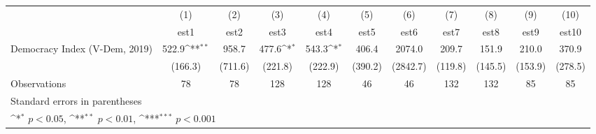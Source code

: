 {
\def\sym#1{\ifmmode^{#1}\else\(^{#1}\)\fi}
\begin{tabular}{l*{10}{c}}
\hline\hline
                    &\multicolumn{1}{c}{(1)}         &\multicolumn{1}{c}{(2)}         &\multicolumn{1}{c}{(3)}         &\multicolumn{1}{c}{(4)}         &\multicolumn{1}{c}{(5)}         &\multicolumn{1}{c}{(6)}         &\multicolumn{1}{c}{(7)}         &\multicolumn{1}{c}{(8)}         &\multicolumn{1}{c}{(9)}         &\multicolumn{1}{c}{(10)}         \\
                    &        est1         &        est2         &        est3         &        est4         &        est5         &        est6         &        est7         &        est8         &        est9         &       est10         \\
\hline
Democracy Index (V-Dem, 2019)&       522.9\sym{**} &       958.7         &       477.6\sym{*}  &       543.3\sym{*}  &       406.4         &      2074.0         &       209.7         &       151.9         &       210.0         &       370.9         \\
                    &     (166.3)         &     (711.6)         &     (221.8)         &     (222.9)         &     (390.2)         &    (2842.7)         &     (119.8)         &     (145.5)         &     (153.9)         &     (278.5)         \\
\hline
Observations        &          78         &          78         &         128         &         128         &          46         &          46         &         132         &         132         &          85         &          85         \\
\hline\hline
\multicolumn{11}{l}{\footnotesize Standard errors in parentheses}\\
\multicolumn{11}{l}{\footnotesize \sym{*} \(p<0.05\), \sym{**} \(p<0.01\), \sym{***} \(p<0.001\)}\\
\end{tabular}
}
